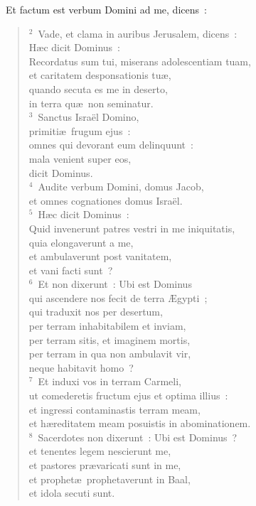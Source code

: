 ~Et factum est verbum Domini ad me, dicens~:
\begin{flushleft}\begin{verse}\vspace{6pt}${}^{2}$~Vade, et clama in auribus Jerusalem, dicens~:\\ H\ae c dicit Dominus~:\\ Recordatus sum tui, miserans adolescentiam tuam,\\ et caritatem desponsationis tu\ae ,\\ quando secuta es me in deserto,\\ in terra qu\ae\ non seminatur.\\
${}^{3}$~Sanctus Isra\"el Domino,\\ primiti\ae\ frugum ejus~:\\ omnes qui devorant eum delinquunt~:\\ mala venient super eos,\\ dicit Dominus.\\
${}^{4}$~Audite verbum Domini, domus Jacob,\\ et omnes cognationes domus Isra\"el.\\
${}^{5}$~H\ae c dicit Dominus~:\\ Quid invenerunt patres vestri in me iniquitatis,\\ quia elongaverunt a me,\\ et ambulaverunt post vanitatem,\\ et vani facti sunt~?\\
${}^{6}$~Et non dixerunt~: Ubi est Dominus\\ qui ascendere nos fecit de terra \AE gypti~;\\ qui traduxit nos per desertum,\\ per terram inhabitabilem et inviam,\\ per terram sitis, et imaginem mortis,\\ per terram in qua non ambulavit vir,\\ neque habitavit homo~?\\
${}^{7}$~Et induxi vos in terram Carmeli,\\ ut comederetis fructum ejus et optima illius~:\\ et ingressi contaminastis terram meam,\\ et h\ae reditatem meam posuistis in abominationem.\\
${}^{8}$~Sacerdotes non dixerunt~: Ubi est Dominus~?\\ et tenentes legem nescierunt me,\\ et pastores pr\ae varicati sunt in me,\\ et prophet\ae\ prophetaverunt in Baal,\\ et idola secuti sunt.\\

\end{verse}
\end{flushleft}
